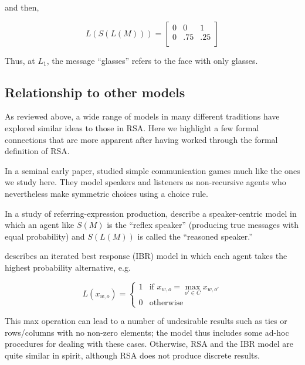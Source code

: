 \documentclass[man,noapacite]{apa2}
\begin{document}
and then,


\begin{equation}
L(S(L(M))) = \left[
    \begin{array}{ccc}
      0 & 0 & 1 \\
      0 & .75 & .25\\
    \end{array}
  \right]
\end{equation}

\noindent Thus, at $L_1$, the message ``glasses'' refers to the face with only glasses.

\subsection{Relationship to other models}

As reviewed above, a wide range of models in many different traditions have explored similar ideas to those in RSA. Here we highlight a few formal connections that are more apparent after having worked through the formal definition of RSA.

In a seminal early paper,  studied simple communication games much like the ones we study here. They model speakers and listeners as non-recursive agents who nevertheless make symmetric choices using a  choice rule.

In a study of referring-expression production,  describe a speaker-centric model in which an agent like $S(M)$ is the ``reflex speaker'' (producing true messages with equal probability) and $S(L(M))$ is called the ``reasoned speaker.''

 describes an iterated best response (IBR) model in which each agent takes the highest probability alternative, e.g.

\begin{equation}
L(x_{w,o}) = \begin{cases}
1 &\mbox{if } x_{w,o} = \max_{o' \in C}{x_{w,o'}}  \\
0 &\mbox{otherwise}
\end{cases}
\end{equation}

\noindent This max operation can lead to a number of undesirable results such as ties or rows/columns with no non-zero elements; the model thus includes some ad-hoc procedures for dealing with these cases. Otherwise, RSA and the IBR model are quite similar in spirit, although RSA does not produce discrete results.
\end{document}

